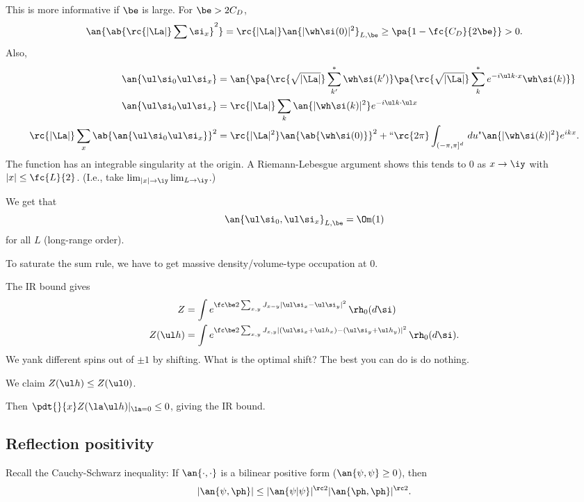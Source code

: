 This is more informative if $\be$ is large. For $\be >2 C_D$, 
\[
\an{\ab{\rc{|\La|}\sum \si_x}^2}=
\rc{|\La|}\an{|\wh \si(0)|^2}_{L,\be} \ge \pa{1-\fc{C_D}{2\be}}>0.
\]
Also, 
\begin{align}
\an{\ul \si_0\ul\si_x} &= 
\an{\pa{ \rc{\sqrt{|\La|}} \sum_{k'}^* \wh \si(k')}
\pa{\rc{\sqrt{|\La|}} \sum_k^* e^{-i\ul k \cdot x} \wh \si(k)}}\\
\an{\ul\si_0\ul \si_x}&= \rc{|\La|} \sum_k\an{ |\wh \si(k)|^2} e^{-i\ul k\cdot \ul x}\\
\rc{|\La|}\sum_x\ab{\an{\ul \si_0\ul \si_x} }^2 &= \rc{|\La|^2} \an{\ab{\wh \si(0)}}^2
+ \text{``}\rc{2\pi} \int_{(-\pi, \pi]^d} \,du\text{"} \an{|\wh \si(k)|^2} e^{ikx}.
\end{align}
The function has an integrable singularity at the origin. A Riemann-Lebesgue argument shows this tends to 0 as $x\to \iy$ with $|x|\le \fc{L}{2}$. (I.e., take $\lim_{|x|\to \iy}\lim_{L\to \iy}$.)

We get that 
\[\an{\ul\si_0,\ul\si_x}_{L,\be} =\Om(1)
\] for all $L$ (long-range order).

To saturate the sum rule, we have to get massive density/volume-type occupation at 0.

The IR bound gives
\begin{align}
Z&=\int e^{\fc \be 2 \sum_{x,y} J_{x-y} |\ul \si_x - \ul \si_y|^2 }\,\rh_0(d\si)\\
Z(\ul h) &= \int e^{\fc \be2\sum_{x,y} J_{x,y}|(\ul\si_x + \ul h_x) - (\ul \si_y + \ul h_y)|^2}\, \rh_0(d\si).
\end{align}
We yank different spins out of $\pm1$ by shifting. What is the optimal shift? The best you can do is do nothing.

We claim $Z(\ul h) \le Z(\ul 0)$.

Then $\pdt{}{x} Z(\la \ul h)|_{\la=0} \le 0$, giving the IR bound.

\subsection{Reflection positivity}
Recall the Cauchy-Schwarz inequality: If $\an{\cdot, \cdot}$ is a bilinear positive form ($\an{\psi,\psi}\ge 0$), then
\[
|\an{\psi,\ph}|\le |\an{\psi|\psi}|^{\rc 2}|\an{\ph,\ph}|^{\rc 2}.
\]

